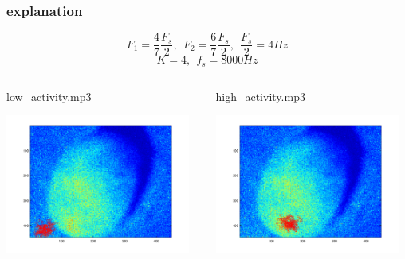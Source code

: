 \documentclass{beamer} %
\begin{document}
\begin{frame}
\frametitle{explanation}
\begin{equation*}
F_1=\frac{4}{7}\frac{F_s}{2},~~F_2=\frac{6}{7}\frac{F_s}{2},~~\frac{F_s}{2}=4Hz
\end{equation*}
\begin{equation*}
 K=4,~~f_s=8000Hz
\end{equation*}

\begin{columns}
\begin{column}{0.5\textwidth}
low\_activity.mp3
    \begin{center}
     \includegraphics[width=0.95\textwidth]{images/slected_points_low.png}
     \end{center}
\end{column}
\begin{column}{0.5\textwidth}  %
high\_activity.mp3
    \begin{center}
     \includegraphics[width=0.95\textwidth]{images/slected_points_high.png}
     \end{center}
\end{column}
\end{columns}
\end{frame}
\end{document}
